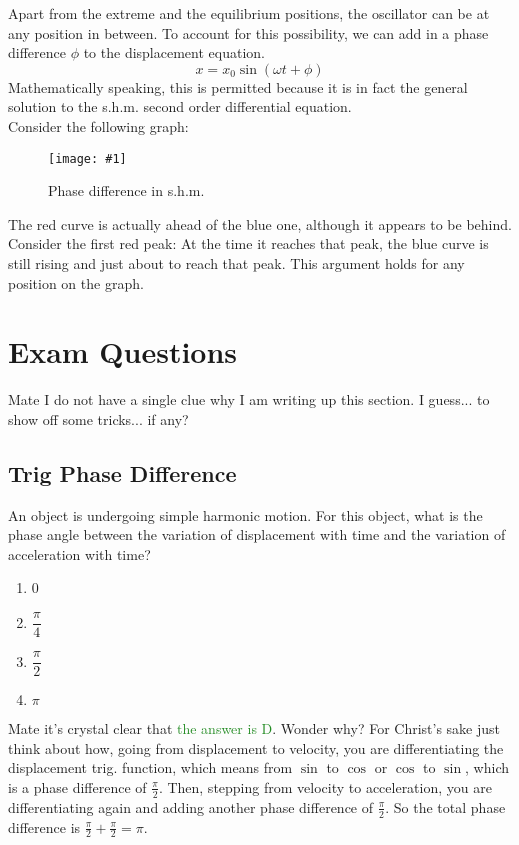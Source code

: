 \documentclass[a4paper,12pt]{article}
\let\oldsection\section
\renewcommand\section{\clearpage\oldsection}
\newcommand{\lb}{\\[8pt]}
\newcommand{\img}[4]{\begin{center}
  \begin{figure}[H]
    \centering
    \texttt{[image: \#1]}
    \caption{#3}
    \label{fig:#4}
  \end{figure}
\end{center}}
\begin{document}
Apart from the extreme and the equilibrium positions, the oscillator can be at any position in between. To account for this possibility, we can add in a phase difference $\phi$ to the displacement equation.
$$x = x_0\sin(\omega t + \phi)$$
Mathematically speaking, this is permitted because it is in fact the general solution to the s.h.m. second order differential equation.\lb
Consider the following graph:
\img{shmphase.png}{0.6}{Phase difference in s.h.m.}{shmphase}
The red curve is actually ahead of the blue one, although it appears to be behind. Consider the first red peak: At the time it reaches that peak, the blue curve is still rising and just about to reach that peak. This argument holds for any position on the graph.

\section{Exam Questions}

Mate I do not have a single clue why I am writing up this section. I guess... to show off some tricks... if any?

\subsection{Trig Phase Difference}

An object is undergoing simple harmonic motion. For this object, what is the phase angle between the variation of displacement with time and the variation of acceleration with time?

\begin{enumerate}[label=(\alph*)]
  \item 0
  \item $\dfrac{\pi}{4}$
  \item $\dfrac{\pi}{2}$
  \item $\pi$
\end{enumerate}

Mate it's crystal clear that \textcolor{ForestGreen}{the answer is D}. Wonder why? For Christ's sake just think about how, going from displacement to velocity, you are differentiating the displacement trig. function, which means from $\sin$ to $\cos$ or $\cos$ to $\sin$, which is a phase difference of $\frac{\pi}{2}$. Then, stepping from velocity to acceleration, you are differentiating again and adding another phase difference of $\frac{\pi}{2}$. So the total phase difference is $\frac{\pi}{2} + \frac{\pi}{2} = \pi$.

\pagebreak
\end{document}
